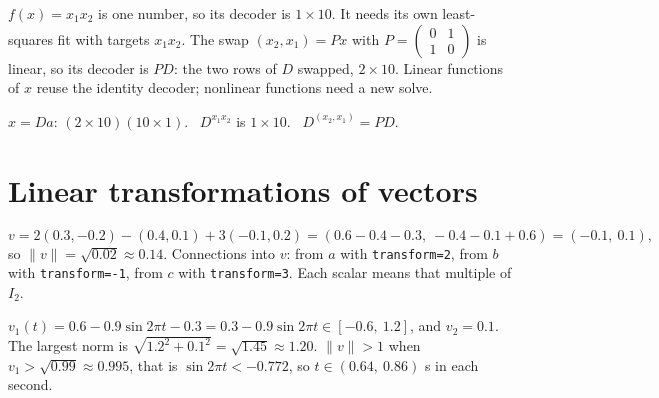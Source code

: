 \documentclass[11pt,letterpaper]{article}
\newcommand{\ans}[1]{\par\vspace{4pt}{\bfseries #1}\quad}
\begin{document}
\ans{Q2}
$f(x) = x_1x_2$ is one number, so its decoder is $1 \times 10$. It needs its own least-squares fit with targets $x_1x_2$. The swap $(x_2, x_1) = Px$ with $P = \begin{pmatrix}0 & 1\\1 & 0\end{pmatrix}$ is linear, so its decoder is $PD$: the two rows of $D$ swapped, $2 \times 10$. Linear functions of $x$ reuse the identity decoder; nonlinear functions need a new solve.
\begin{result}
$\hat x = Da$: $(2\times10)(10\times1)$. \ $D^{x_1x_2}$ is $1\times10$. \ $D^{(x_2,x_1)} = PD$.
\end{result}

\section{Linear transformations of vectors}

\ans{Q1}
\[
v = 2(0.3, -0.2) - (0.4, 0.1) + 3(-0.1, 0.2) = (0.6 - 0.4 - 0.3,\ -0.4 - 0.1 + 0.6) = (-0.1,\ 0.1),
\]
so $\|v\| = \sqrt{0.02} \approx 0.14$.
Connections into $v$: from $a$ with \texttt{transform=2}, from $b$ with \texttt{transform=-1}, from $c$ with \texttt{transform=3}. Each scalar means that multiple of $I_2$.

\ans{Q2}
$v_1(t) = 0.6 - 0.9\sin 2\pi t - 0.3 = 0.3 - 0.9\sin 2\pi t \in [-0.6,\ 1.2]$, and $v_2 = 0.1$. The largest norm is $\sqrt{1.2^2 + 0.1^2} = \sqrt{1.45} \approx 1.20$. $\|v\| > 1$ when $v_1 > \sqrt{0.99} \approx 0.995$, that is $\sin 2\pi t < -0.772$, so $t \in (0.64,\ 0.86)$ s in each second.
\end{document}
